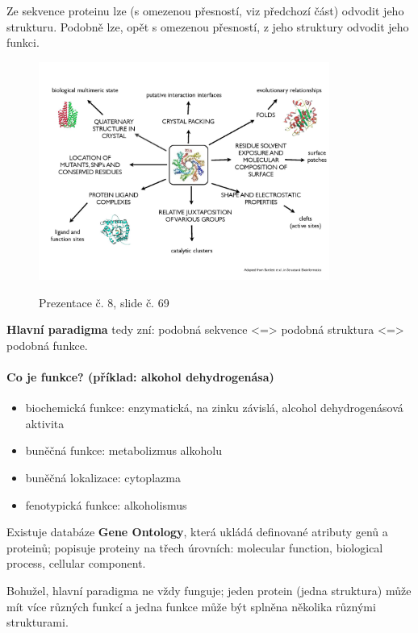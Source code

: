 \documentclass[DIV=8]{scrreprt}
\begin{document}
Ze sekvence proteinu lze (s omezenou přesností, viz předchozí část) odvodit jeho strukturu. Podobně lze, opět s omezenou přesností, z jeho struktury odvodit jeho funkci. \begin{figure}
    \caption{Prezentace č. 8, slide č. 69}
    \includegraphics[width=0.85\textwidth]{slides-8/slide-69.jpg}
    \centering
    \label{slides-8-slide-69}
\end{figure}


\textbf{Hlavní paradigma} tedy zní: podobná sekvence <=> podobná struktura <=> podobná funkce.

\paragraph{Co je funkce? (příklad: alkohol dehydrogenása)}
\begin{itemize}[nosep]
    \item biochemická funkce: enzymatická, na zinku závislá, alcohol dehydrogenásová aktivita
    \item buněčná funkce: metabolizmus alkoholu
    \item buněčná lokalizace: cytoplazma
    \item fenotypická funkce: alkoholismus
\end{itemize}



Existuje databáze \textbf{Gene Ontology}, která ukládá definované atributy genů a proteinů; popisuje proteiny na třech úrovních: molecular function, biological process, cellular component.

Bohužel, hlavní paradigma ne vždy funguje; jeden protein (jedna struktura) může mít více různých funkcí a jedna funkce může být splněna několika různými strukturami.
\end{document}
